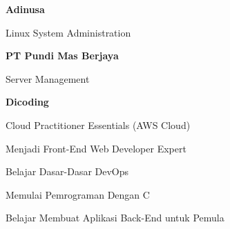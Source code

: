 \begin{cventries}
  \cventry
  {\bfseries Adinusa}
  {}{}{}{
    \begin{cvitems}
      \item Linux System Administration
    \end{cvitems}
  }

  \cventry
  {\bfseries PT Pundi Mas Berjaya}
  {}{}{}{
    \begin{cvitems}
      \item Server Management
    \end{cvitems}
  }

  \cventry
  {\bfseries Dicoding}
  {}{}{}{
    \begin{cvitems}
      \item Cloud Practitioner Essentials (AWS Cloud)
      \item Menjadi Front-End Web Developer Expert
      \item Belajar Dasar-Dasar DevOps
      \item Memulai Pemrograman Dengan C
      \item Belajar Membuat Aplikasi Back-End untuk Pemula
    \end{cvitems}
  }

\end{cventries}
